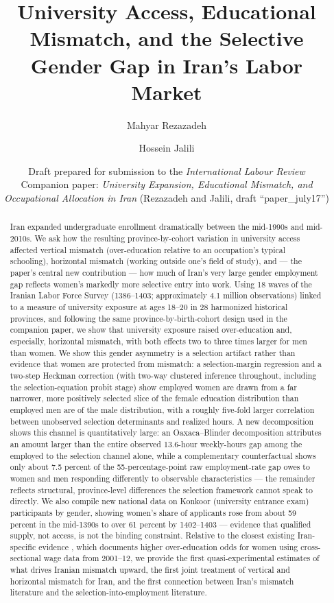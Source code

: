 \documentclass[11pt]{article}
\title{University Access, Educational Mismatch, and the Selective Gender Gap in Iran's Labor Market}
\author[1]{Mahyar Rezazadeh}
\author[2]{Hossein Jalili}
\affil[1,2]{Simon Fraser University}
\date{Draft prepared for submission to the \emph{International Labour Review}\\[2pt]
\small Companion paper: \emph{University Expansion, Educational Mismatch, and Occupational Allocation in Iran} (Rezazadeh and Jalili, draft ``paper\_july17'')}
\begin{document}
\maketitle

\begin{abstract}
\noindent Iran expanded undergraduate enrollment dramatically between the mid-1990s and mid-2010s. We ask how the resulting province-by-cohort variation in university access affected vertical mismatch (over-education relative to an occupation's typical schooling), horizontal mismatch (working outside one's field of study), and --- the paper's central new contribution --- how much of Iran's very large gender employment gap reflects women's markedly more selective entry into work. Using 18 waves of the Iranian Labor Force Survey (1386--1403; approximately 4.1 million observations) linked to a measure of university exposure at ages 18--20 in 28 harmonized historical provinces, and following the same province-by-birth-cohort design used in the companion paper, we show that university exposure raised over-education and, especially, horizontal mismatch, with both effects two to three times larger for men than women. We show this gender asymmetry is a selection artifact rather than evidence that women are protected from mismatch: a selection-margin regression and a two-step Heckman correction (with two-way clustered inference throughout, including the selection-equation probit stage) show employed women are drawn from a far narrower, more positively selected slice of the female education distribution than employed men are of the male distribution, with a roughly five-fold larger correlation between unobserved selection determinants and realized hours. A new decomposition shows this channel is quantitatively large: an Oaxaca--Blinder decomposition attributes an amount larger than the entire observed 13.6-hour weekly-hours gap among the employed to the selection channel alone, while a complementary counterfactual shows only about 7.5 percent of the 55-percentage-point raw employment-rate gap owes to women and men responding differently to observable characteristics --- the remainder reflects structural, province-level differences the selection framework cannot speak to directly. We also compile new national data on Konkoor (university entrance exam) participants by gender, showing women's share of applicants rose from about 59 percent in the mid-1390s to over 61 percent by 1402--1403 --- evidence that qualified supply, not access, is not the binding constraint. Relative to the closest existing Iran-specific evidence \citep{haddad2017}, which documents higher over-education odds for women using cross-sectional wage data from 2001--12, we provide the first quasi-experimental estimates of what drives Iranian mismatch upward, the first joint treatment of vertical and horizontal mismatch for Iran, and the first connection between Iran's mismatch literature and the selection-into-employment literature.


\end{abstract}
\end{document}
